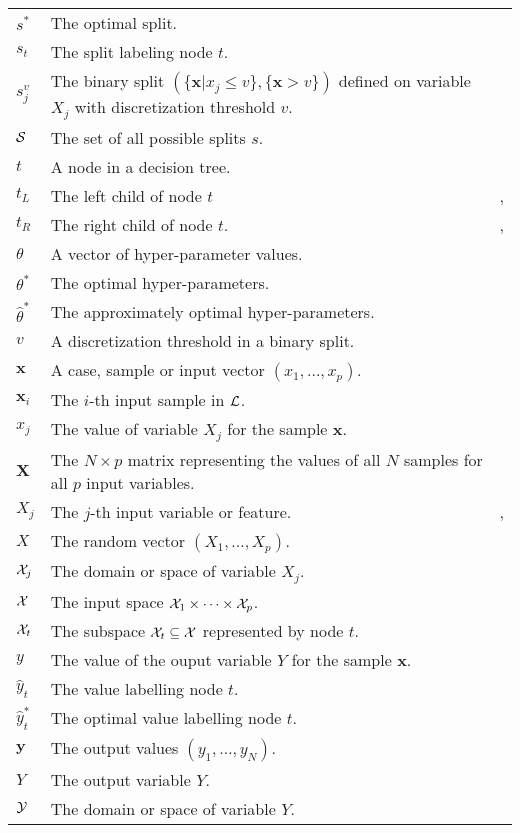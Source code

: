 {\begin{tabularx}{\textwidth}{ l X l }
$s^*$ & The optimal split. & \pageref{ntn:s-star} \\
$s_t$ & The split labeling node $t$. & \pageref{ntn:s_t} \\
$s_j^v$ & The binary split $(\{\mathbf{x}|x_j \leq v\}, \{\mathbf{x} > v\})$ defined on variable $X_j$ with discretization threshold $v$. & \pageref{ntn:s_jv} \\
${\cal S}$ & The set of all possible splits $s$. & \pageref{ntn:S-all} \\
$t$ & A node in a decision tree. & \pageref{ntn:node} \\
$t_L$ & The left child of node $t$ & \pageref{ntn:t_L}, \pageref{ntn:t_L2} \\
$t_R$ & The right child of node $t$. & \pageref{ntn:t_R}, \pageref{ntn:t_R2} \\
$\theta$ & A vector of hyper-parameter values. & \pageref{ntn:theta} \\
$\theta^*$ & The optimal hyper-parameters. & \pageref{ntn:theta-star} \\
$\widehat{\theta}^*$ & The approximately optimal hyper-parameters. & \pageref{ntn:theta-star-approx} \\
$v$ & A discretization threshold in a binary split. & \pageref{ntn:v} \\
$\textbf{x}$ & A case, sample or input vector $(x_1, \dots, x_p)$. & \pageref{ntn:sample-x} \\
$\textbf{x}_i$ & The $i$-th input sample in ${\cal L}$. & \pageref{ntn:sample-x_i} \\
$x_j$ & The value of variable $X_j$ for the sample $\textbf{x}$. & \pageref{ntn:value-x_j} \\
$\textbf{X}$ & The $N\times p$ matrix representing the values of all $N$ samples for all $p$ input variables. & \pageref{ntn:matrix-X} \\
$X_j$ & The $j$-th input variable or feature. & \pageref{ntn:var-X_j}, \pageref{ntn:var-X_j2} \\
$X$ & The random vector $(X_1,\dots,X_p)$. & \pageref{ntn:vector-X}\\
${\cal X}_j$ & The domain or space of variable $X_j$. & \pageref{ntn:space-X_j} \\
${\cal X}$ & The input space ${\cal X}_1 \times \dots \times {\cal X}_p$. & \pageref{ntn:space-X} \\
${\cal X}_t$ & The subspace ${\cal X}_t \subseteq {\cal X}$ represented by node $t$. & \pageref{ntn:node-space} \\
$y$ & The value of the ouput variable $Y$ for the sample $\textbf{x}$. & \pageref{ntn:value-y} \\
$\widehat{y}_t$ & The value labelling node $t$. & \pageref{ntn:y_t} \\
$\widehat{y}_t^*$ & The optimal value labelling node $t$. & \pageref{ntn:y_t-star} \\
$\mathbf{y}$ & The output values $(y_1,\dots,y_N)$. & \pageref{ntn:vector-y} \\
$Y$ & The output variable $Y$. & \pageref{ntn:var-Y} \\
${\cal Y}$ & The domain or space of variable $Y$. & \pageref{ntn:space-Y} \\
\end{tabularx}
}
